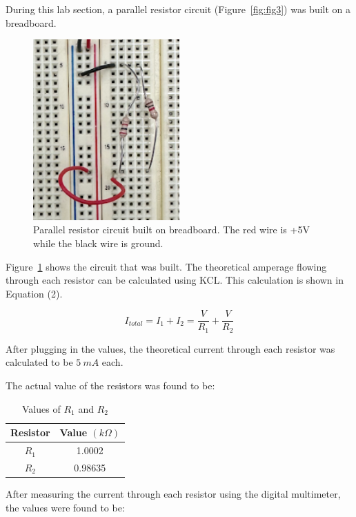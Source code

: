 \documentclass{article}
\begin{document}
During this lab section, a parallel resistor circuit (Figure~\ref{fig:fig3}) was built
on a breadboard.

\begin{figure}[H]
	\centering
	\includegraphics[angle=90,origin=c,width=0.5\textwidth]{built_figure3.png}
	\caption{Parallel resistor circuit built on breadboard. The red wire is +5V while the black wire is ground.}
	\label{fig:fig4}
\end{figure}

Figure~\ref{fig:fig4} shows the circuit that was built.
The theoretical amperage flowing through each resistor can be calculated
using KCL. This calculation is shown in Equation (2).

\begin{equation}
    I_{total} = I_1 + I_2 = \frac{V}{R_1} + \frac{V}{R_2}  
\end{equation}

After plugging in the values, the theoretical current through each resistor was
calculated to be $5 \: mA$ each.

The actual value of the resistors was found to be:
\begin{table}[H]
    \centering
    \begin{tabular}{|c|c|}
        \hline
        Resistor & Value $(k\Omega)$ \\
        \hline
        $R_1$ & 1.0002 \\
        \hline
        $R_2$ & 0.98635 \\
        \hline
    \end{tabular}
    \caption{Values of $R_1$ and $R_2$}
    \label{tab:2.2resistor_values}
\end{table}

After measuring the current through each resistor using the digital multimeter, 
the values were found to be:
\end{document}
